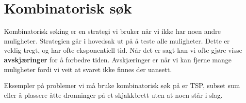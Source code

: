 \section{Kombinatorisk søk}
Kombinatorisk søking er en strategi vi bruker når vi ikke har noen andre muligheter. Strategien går i hovedsak ut på å teste alle muligheter. Dette er veldig tregt, og har ofte eksponentiell tid. Når det er sagt kan vi ofte gjøre visse \textbf{avskjæringer} for å forbedre tiden. Avskjæringer er når vi kan fjerne mange muligheter fordi vi veit at svaret ikke finnes der uansett. 

Eksempler på problemer vi må bruke kombinatorisk søk på er TSP, subset sum eller å plassere åtte dronninger på et skjakkbrett uten at noen står i slag.